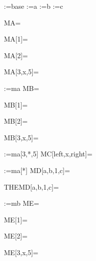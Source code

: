 \documentclass{article}
\begin{document}

\ma:={base}
\ma[1]:={a}
\ma[2]:={b}
\ma[3,x,5]:={c}

MA=\ma\par
MA[1]=\ma[1]\par
MA[2]=\ma[2]\par
MA[3,x,5]=\ma[3,x,5]\par

\mb*:={ma}
MB=\mb\par
MB[1]=\mb[1]\par
MB[2]=\mb[2]\par
MB[3,x,5]=\mb[3,x,5]\par
:={ma[3,*,5]}
MC[left,x,right]=\par
\md*[a,b,*,c]:={ma[*]}
MD[a,b,1,c]=\md[a,b,1,c]\par
THEMD[a,b,1,c]=\themd[a,b,1,c]\par

\me*:={mb}
ME=\me\par
ME[1]=\me[1]\par
ME[2]=\me[2]\par
ME[3,x,5]=\me[3,x,5]\par
\end{document}

